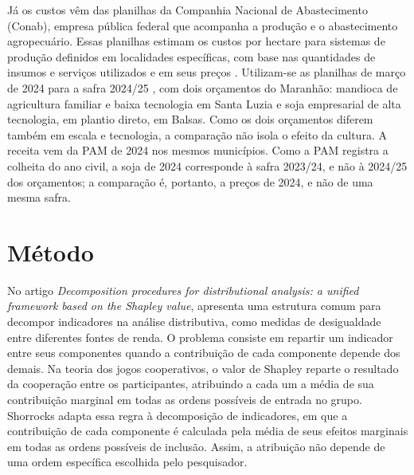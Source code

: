 \documentclass[11pt,a4paper]{article}
\begin{document}
Já os custos vêm das planilhas da Companhia Nacional de Abastecimento (Conab), empresa pública federal que acompanha a produção e o abastecimento agropecuário. Essas planilhas estimam os custos por hectare para sistemas de produção definidos em localidades específicas, com base nas quantidades de insumos e serviços utilizados e em seus preços \citep{conab2020}. Utilizam-se as planilhas de março de 2024 para a safra 2024/25 \citep{conab2024}, com dois orçamentos do Maranhão: mandioca de agricultura familiar e baixa tecnologia em Santa Luzia e soja empresarial de alta tecnologia, em plantio direto, em Balsas. Como os dois orçamentos diferem também em escala e tecnologia, a comparação não isola o efeito da cultura. A receita vem da PAM de 2024 nos mesmos municípios. Como a PAM registra a colheita do ano civil, a soja de 2024 corresponde à safra 2023/24, e não à 2024/25 dos orçamentos; a comparação é, portanto, a preços de 2024, e não de uma mesma safra.

\section{Método}\label{sec:metodo}

No artigo \textit{Decomposition procedures for distributional analysis: a unified framework based on the Shapley value}, \citet{shorrocks2013} apresenta uma estrutura comum para decompor indicadores na análise distributiva, como medidas de desigualdade entre diferentes fontes de renda. O problema consiste em repartir um indicador entre seus componentes quando a contribuição de cada componente depende dos demais. Na teoria dos jogos cooperativos, o valor de Shapley reparte o resultado da cooperação entre os participantes, atribuindo a cada um a média de sua contribuição marginal em todas as ordens possíveis de entrada no grupo. Shorrocks adapta essa regra à decomposição de indicadores, em que a contribuição de cada componente é calculada pela média de seus efeitos marginais em todas as ordens possíveis de inclusão. Assim, a atribuição não depende de uma ordem específica escolhida pelo pesquisador.
\end{document}
